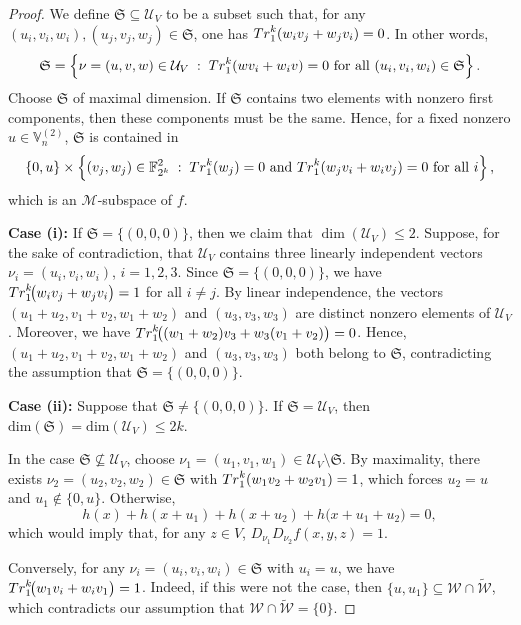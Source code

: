 \documentclass[10pt,a4paper]{amsart}
\newcommand{\Tr}{{\rm Tr}}
\newcommand{\V}{\mathbb{V}}
\begin{document}
\begin{proof}
		We define $\mathfrak S \subseteq \mathcal U_V$ to be a subset such that, 
		for any $(u_i,v_i,w_i), (u_j,v_j,w_j)\in \mathfrak S$, one has $\Tr_1^k\!\left(w_i v_j + w_j v_i\right)=0$. In other words,
		\[
		\mathfrak{S}
		=
		\left\{
		\nu=(u,v,w)\in \mathcal{U}_V
		\; :\;
		\Tr_1^k\!\left(w v_i + w_i v\right)=0
		\ \text{for all } (u_i,v_i,w_i)\in \mathfrak{S}
		\right\}.\]
		Choose \(\mathfrak{S}\) of maximal dimension.
		If \(\mathfrak{S}\) contains two elements with nonzero first components,
		then these components must be the same.
		Hence, for a fixed nonzero \(u\in \V_n^{(2)} \),
		\(\mathfrak{S}\) is contained in
		\[
		\{0,u\}\times
		\left\{
		(v_j,w_j)\in \mathbb{F}_{2^k}^2
		\; : \;
		\Tr_1^k(w_j)=0
		\ \text{and}\
		\Tr_1^k(w_j v_i + w_i v_j)=0
		\ \text{for all } i
		\right\},
		\]  
		which is an \(\mathcal{M}\)-subspace of \(f\). 
		
		\smallskip
		
		\noindent\textbf{Case (i):}
		If \(\mathfrak{S}=\{(0,0,0)\}\), then
		we claim that \(\dim(\mathcal{U}_V)\leq 2\).
		Suppose, for the sake of contradiction, that \(\mathcal{U}_V\) contains
		three linearly independent vectors
		\(\nu_i=(u_i,v_i,w_i)\), \(i=1,2,3\).
		Since \(\mathfrak{S}=\{(0,0,0)\}\), we have $\Tr_1^k\!\bigl(w_i v_j + w_j v_i\bigr)=1$ for all $i\neq j$.
		By linear independence, the vectors
		\((u_1+u_2,v_1+v_2,w_1+w_2)\) and
		\((u_3,v_3,w_3)\)
		are distinct nonzero elements of \(\mathcal{U}_V\).
		Moreover, we have $\Tr_1^k\!\bigl((w_1+w_2)v_3+w_3(v_1+v_2)\bigr)=0$.
		Hence,
		\((u_1+u_2,v_1+v_2,w_1+w_2)\) and
		\((u_3,v_3,w_3)\)
		both belong to \(\mathfrak{S}\),
		contradicting the assumption that
		\(\mathfrak{S}=\{(0,0,0)\}\).
		
		\smallskip
		\noindent\textbf{Case (ii):}
		Suppose that \(\mathfrak{S}\neq\{(0,0,0)\}\). If
		\(\mathfrak{S} =\mathcal{U}_V\),
		then $\mathrm{dim}(\mathfrak{S}) =  \mathrm{dim}(\mathcal{U}_V)\leq 2k$.
		
		In the case $\mathfrak{S} \not\subseteq \mathcal{U}_V$, choose
		\(\nu_1=(u_1,v_1,w_1)\in \mathcal{U}_V\setminus \mathfrak{S}\).
		By maximality, there exists
		\(\nu_2=(u_2,v_2,w_2)\in \mathfrak{S}\)  with
		\(\Tr_1^k(w_1v_2+w_2v_1)=1\),
		which forces \(u_2=u\) and \(u_1\notin\{0,u\}\).
		Otherwise,
		\[
		h(x)+h(x+u_1)+h(x+u_2)+h\bigl(x+u_1+u_2\bigr)=0,
		\]
		which would imply that, for any \(z\in V\), $D_{\nu_1}D_{\nu_2}f(x,y,z)=1$.
		
		Conversely, for any \(\nu_i=(u_i,v_i,w_i)\in \mathfrak{S}\) with \(u_i=u\),
		we have $\Tr_1^k\!\bigl(w_1v_i+w_iv_1\bigr)=1$.
		Indeed, if this were not the case, then
		\(\{u,u_1\}\subseteq \mathcal{W} \cap \widetilde{\mathcal{W} }\),
		which contradicts our assumption that
		\(\mathcal{W} \cap \widetilde{\mathcal{W} }=\{0\}\).
		

\end{proof}
\end{document}
